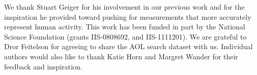 We thank Stuart Geiger for his involvement in our previous work and for the inspiration he provided toward pushing for measurements that more accurately represent human activity.  This work has been funded in part by the National Science Foundation (grants IIS-0808692, and IIS-1111201).  We are grateful to Dror Feitelson for agreeing to share the AOL search dataset with us. Individual authors would also like to thank Katie Horn and Margret Wander for their feedback and inspiration.
